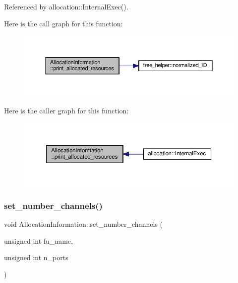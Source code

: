 Referenced by allocation\+::\+Internal\+Exec().

Here is the call graph for this function\+:
\nopagebreak
\begin{figure}[H]
\begin{center}
\leavevmode
\includegraphics[width=350pt]{d7/d79/classAllocationInformation_a9ecf70563f77983034205f506e59728a_cgraph}
\end{center}
\end{figure}
Here is the caller graph for this function\+:
\nopagebreak
\begin{figure}[H]
\begin{center}
\leavevmode
\includegraphics[width=350pt]{d7/d79/classAllocationInformation_a9ecf70563f77983034205f506e59728a_icgraph}
\end{center}
\end{figure}
\mbox{\label{classAllocationInformation_a7f576f95bbe77b0b548f34ed2550a43c}} 
\subsubsection{\texorpdfstring{set\+\_\+number\+\_\+channels()}{set\_number\_channels()}}
{\footnotesize\ttfamily void Allocation\+Information\+::set\+\_\+number\+\_\+channels (\begin{DoxyParamCaption}\item[{unsigned int}]{fu\+\_\+name,  }\item[{unsigned int}]{n\+\_\+ports }\end{DoxyParamCaption})\hspace{0.3cm}{\ttfamily [private]}}



